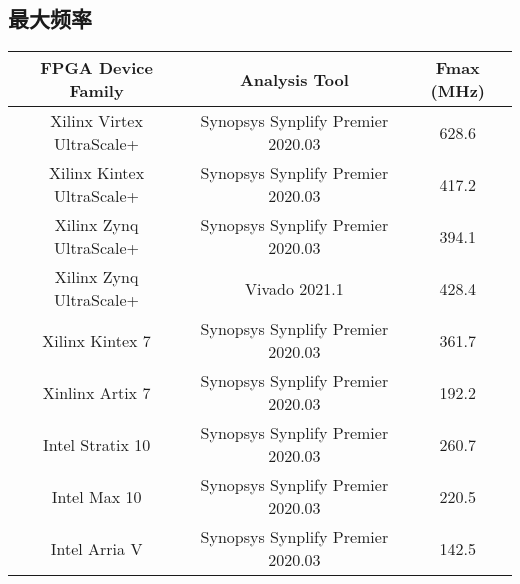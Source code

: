 \documentclass[12pt, a4paper, oneside]{ctexbook}
\begin{document}
		\subsection{最大频率}
			\begin{table}[h]
			\centering
				\begin{tabular}{|c|c|c|}
					\hline
					\textbf{FPGA Device Family} & \textbf{Analysis Tool}            & \textbf{Fmax (MHz)} \\ \hline
					Xilinx Virtex UltraScale+   & Synopsys Synplify Premier 2020.03 & 628.6               \\ \hline
					Xilinx Kintex UltraScale+   & Synopsys Synplify Premier 2020.03 & 417.2               \\ \hline
					Xilinx Zynq UltraScale+     & Synopsys Synplify Premier 2020.03 & 394.1               \\ \hline
					Xilinx Zynq UltraScale+     & Vivado 2021.1                     & 428.4               \\ \hline
					Xilinx Kintex 7             & Synopsys Synplify Premier 2020.03 & 361.7               \\ \hline
					Xinlinx Artix 7             & Synopsys Synplify Premier 2020.03 & 192.2               \\ \hline
					Intel Stratix 10            & Synopsys Synplify Premier 2020.03 & 260.7               \\ \hline
					Intel Max 10                & Synopsys Synplify Premier 2020.03 & 220.5               \\ \hline
					Intel Arria V               & Synopsys Synplify Premier 2020.03 & 142.5               \\ \hline
				\end{tabular}
			\end{table}
\end{document}
